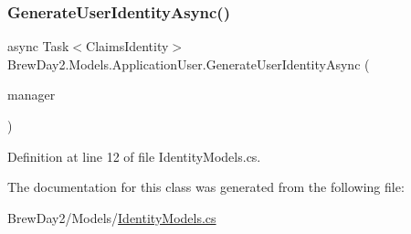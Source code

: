 \subsubsection{\texorpdfstring{Generate\+User\+Identity\+Async()}{GenerateUserIdentityAsync()}}
{\footnotesize\ttfamily async Task$<$Claims\+Identity$>$ Brew\+Day2.\+Models.\+Application\+User.\+Generate\+User\+Identity\+Async (\begin{DoxyParamCaption}\item[{User\+Manager$<$ \mbox{\hyperlink{class_brew_day2_1_1_models_1_1_application_user}{Application\+User}} $>$}]{manager }\end{DoxyParamCaption})}



Definition at line 12 of file Identity\+Models.\+cs.



The documentation for this class was generated from the following file\+:\begin{DoxyCompactItemize}
\item 
Brew\+Day2/\+Models/\mbox{\hyperlink{_identity_models_8cs}{Identity\+Models.\+cs}}\end{DoxyCompactItemize}

